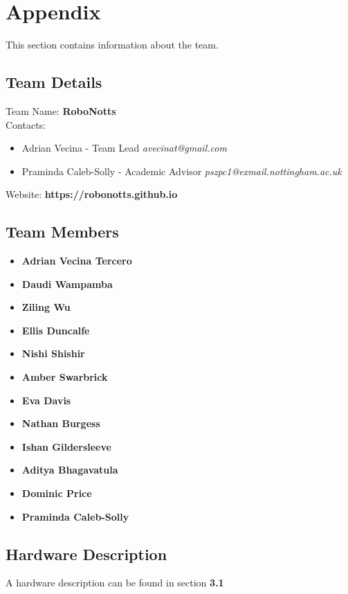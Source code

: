 \newpage
\section{Appendix}
This section contains information about the team.

\subsection{Team Details}

Team Name: \textbf{RoboNotts}\\
Contacts: 
\begin{itemize}
    \item Adrian Vecina - Team Lead \textit{avecinat@gmail.com}
    \item Praminda Caleb-Solly - Academic Advisor \textit{pszpc1@exmail.nottingham.ac.uk}
\end{itemize}
Website: \textbf{https://robonotts.github.io} 

\subsection{Team Members}

\begin{itemize}
    \item \textbf{Adrian Vecina Tercero}
    \item \textbf{Daudi Wampamba}
    \item \textbf{Ziling Wu}
    \item \textbf{Ellis Duncalfe}
    \item \textbf{Nishi Shishir}
    \item \textbf{Amber Swarbrick}
    \item \textbf{Eva Davis}
    \item \textbf{Nathan Burgess}
    \item \textbf{Ishan Gildersleeve}
    \item \textbf{Aditya Bhagavatula}
    \item \textbf{Dominic Price}
    \item \textbf{Praminda Caleb-Solly}

\end{itemize}

\subsection{Hardware Description}

A hardware description can be found in section \textbf{3.1}

